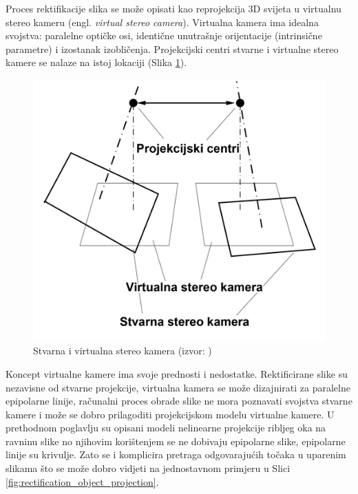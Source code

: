 \documentclass[../seminar.tex]{subfiles}
\begin{document}
Proces rektifikacije slika se može opisati kao reprojekcija 3D svijeta u virtualnu stereo kameru (engl. \textit{virtual stereo camera}). Virtualna kamera ima idealna svojstva: paralelne optičke osi, identične unutrašnje orijentacije (intrinsične parametre) i izostanak izobličenja. Projekcijski centri stvarne i virtualne stereo kamere se nalaze na istoj lokaciji (Slika \ref{fig:rectification_projection_centers}).

\begin{figure}[ht!]
  \centering
    \includegraphics[width=.5\textwidth]{img_008_projection_centers_smaller.png}
   \caption{Stvarna i virtualna stereo kamera (izvor: \cite{Abraham})}
  \label{fig:rectification_projection_centers}
\end{figure}


Koncept virtualne kamere ima svoje prednosti i nedostatke. Rektificirane slike su nezavisne od stvarne projekcije, virtualna kamera se može dizajnirati za paralelne epipolarne linije, računalni proces obrade slike ne mora poznavati svojstva stvarne kamere i može se dobro prilagoditi projekcijskom modelu virtualne kamere.
U prethodnom poglavlju su opisani modeli nelinearne projekcije ribljeg oka na ravninu slike no njihovim korištenjem se ne dobivaju epipolarne slike, epipolarne linije su krivulje. Zato se i komplicira pretraga odgovarajućih točaka u uparenim slikama što se može dobro vidjeti na jednostavnom primjeru u Slici \ref{fig:rectification_object_projection}. 
\end{document}

